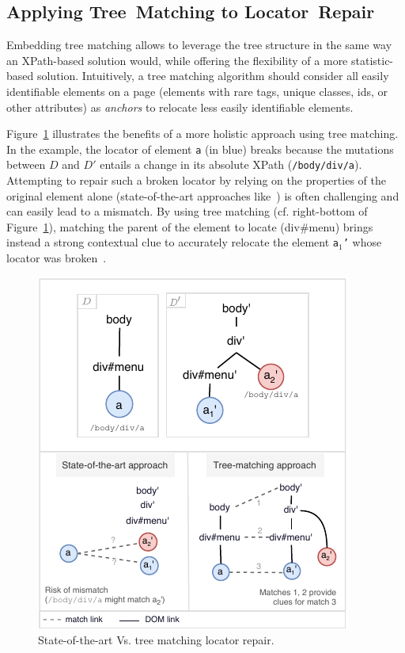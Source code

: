\documentclass[preprint, 12pt]{elsarticle}
\begin{document}
\subsection{Applying Tree~Matching to Locator~Repair}
Embedding tree matching allows \erratum to leverage the tree structure in the same way an XPath-based solution would, while offering the flexibility of a more statistic-based solution.
Intuitively, a tree matching algorithm should consider all easily identifiable elements on a page (elements with rare tags, unique classes, ids, or other attributes) as \textit{anchors} to relocate less easily identifiable elements.

Figure~\ref{fig:holistic} illustrates the benefits of a more holistic approach using tree matching.
In the example, the locator of element \texttt{a} (in blue) breaks because the mutations between $D$ and $D'$ entails a change in its absolute XPath (\texttt{/body/div/a}).
Attempting to repair such a broken locator by relying on the properties of the original element alone (state-of-the-art approaches like~\cite{choudhary2011water,stocco2018visual}) is often challenging and can easily lead to a mismatch. 
By using tree matching (cf. right-bottom of Figure~\ref{fig:holistic}), matching the parent of the element to locate (\textsf{div\#menu}) brings instead a strong contextual clue to accurately relocate the element \texttt{a$_1$'} whose locator was broken~\cite{brisset2020sftm}.

\begin{figure}[]
    \centering
    \includegraphics[width=.8\linewidth]{holistic}
    \caption{State-of-the-art Vs. tree matching locator repair.}
    \label{fig:holistic}
\end{figure}
\end{document}
